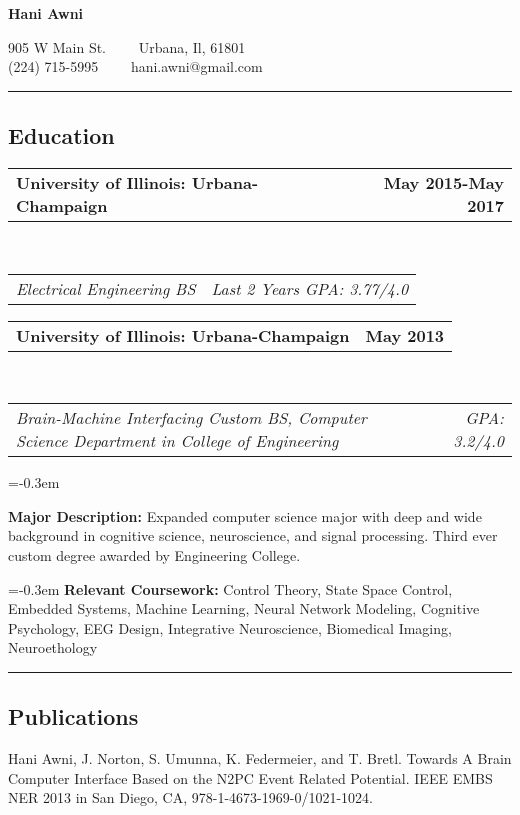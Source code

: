 \documentclass[10pt,letterpaper]{article}
\makeatletter
\newenvironment{indentsection}[1]%
{\begin{list}{}%
	{\setlength{\leftmargin}{#1}}%
	\item[]%
}
{\end{list}}
\newcommand{\headerrow}[2]
{\begin{tabular*}{\linewidth}{l@{\extracolsep{\fill}}r}
	#1 &
	#2 \\
	
\end{tabular*}}
\makeatother
\begin{document}
\begin{center}
{\LARGE \textbf{Hani Awni}}

905 W Main St.\ \ \textbullet
\ \ Urbana, Il, 61801\\
(224) 715-5995\ \ \textbullet
\ \ hani.awni@gmail.com 
\end{center}

\vspace{-0.8em}
\hrule
\vspace{-0.8em}
\subsection*{Education}
\vspace{-0.8em}

	\headerrow
		{\textbf{University of Illinois: Urbana-Champaign}}
		{\textbf{May 2015-May 2017}}
	\\
	\headerrow
		{\emph{Electrical Engineering BS}}
		{\emph{Last 2 Years GPA: 3.77/4.0}}
	\headerrow
		{\textbf{University of Illinois: Urbana-Champaign}}
		{\textbf{May 2013}}
	\\
	\headerrow
		{\emph{Brain-Machine Interfacing Custom BS, Computer Science Department in College of Engineering}}
		{\emph{GPA: 3.2/4.0}}

		\parskip=-0.3em
	\begin{itemize*}
		\item \textbf{Major Description:} Expanded computer science major with deep and wide background in cognitive science, neuroscience, and signal processing. Third ever custom degree awarded by Engineering College. 
		\end{itemize*}
		\parskip=-0.3em
		\textbf{Relevant Coursework:} Control Theory, State Space Control, Embedded Systems, Machine Learning, Neural Network Modeling, Cognitive Psychology, EEG Design, Integrative Neuroscience, Biomedical Imaging, Neuroethology 
	



\hrule
\vspace{-.5em}
\subsection*{Publications}
\vspace{-0.3em}
\begin{indentsection}{\parindent}
\begin{description*}
	\item[]
	Hani Awni, J. Norton, S. Umunna, K. Federmeier, and T. Bretl. Towards A Brain Computer Interface Based on the N2PC Event Related Potential. IEEE EMBS NER 2013 in San Diego, CA, 978-1-4673-1969-0/1021-1024.
\end{description*}
\end{indentsection}
\end{document}
